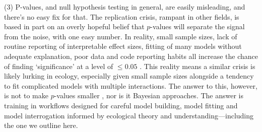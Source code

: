 \documentclass[11pt]{article}
\begin{document}
(3) P-values, and null hypothesis testing in general, are easily misleading, and there’s no easy fix for that. The replication crisis, rampant in other fields, is based in part on an overly hopeful belief that $p$-values will separate the signal from the noise, with one easy number. In reality, small sample sizes, lack of routine reporting of interpretable effect sizes, fitting of many models without adequate explanation, poor data and code reporting habits all increase the chance of finding `significance' at a level of $\le0.05$ \citep{halsey2015,loken2017}. This reality means a similar crisis is likely lurking in ecology, especially given small sample sizes alongside a tendency to fit complicated models with multiple interactions. The answer to this, however, is not to make $p$-values smaller \citep{halsey2015,colquhoun2017}, nor is it Bayesian approaches. %
The answer is training in workflows designed for careful model building, model fitting and model interrogation informed by ecological theory and understanding---including the one we outline here. 


\end{document}
